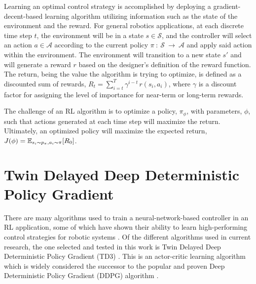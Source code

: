 Learning an optimal control strategy is accomplished by deploying a gradient-decent-based learning algorithm utilizing information such as the state of the environment and the reward. For general robotics applications, at each discrete time step $t$, the environment will be in a state $s \in \mathcal{S}$, and the controller will select an action $a \in \mathcal{A}$ according to the current policy $\pi~:~\mathcal{S}~\rightarrow~\mathcal{A}$ and apply said action within the environment. The environment will transition to a new state $s'$ and will generate a reward $r$ based on the designer's definition of the reward function. The return, being the value the algorithm is trying to optimize, is defined as a discounted sum of rewards, $R_t = \sum_{i=t}^T \gamma^{i-t} \, r(s_i, a_i)$, where $\gamma$ is a discount factor for assigning the level of importance for near-term or long-term rewards.

The challenge of an RL algorithm is to optimize a policy, $\pi_{\phi}$, with parameters, $\phi$, such that actions generated at each time step will maximize the return. Ultimately, an optimized policy will maximize the expected return, $J(\phi) = \mathbb{E}_{s_i \thicksim p_{\pi}, a_i \thicksim \pi}[R_0]$. 

\section{Twin Delayed Deep Deterministic Policy Gradient}

There are many algorithms used to train a neural-network-based controller in an RL application, some of which have shown their ability to learn high-performing control strategies for robotic systems \cite{Zhao2020, Vecerik2017, Plappert2018}. Of the different algorithms used in current research, the one selected and tested in this work is Twin Delayed Deep Deterministic Policy Gradient (TD3) \cite{Fujimoto2018d}. This is an actor-critic learning algorithm which is widely considered the successor to the popular and proven Deep Deterministic Policy Gradient (DDPG) algorithm \cite{Lillicrap2016h}. 


